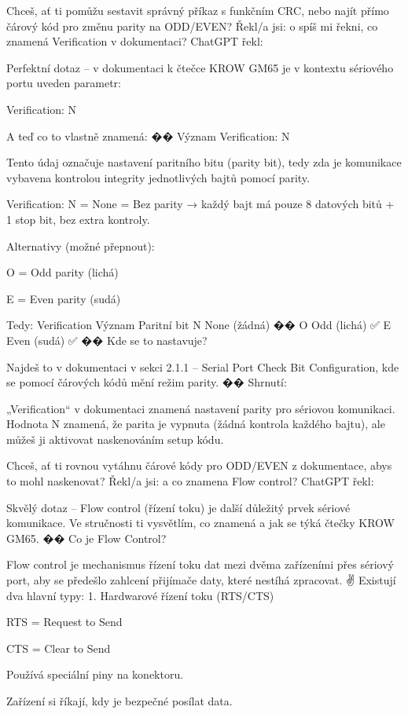 Chceš, ať ti pomůžu sestavit správný příkaz s funkčním CRC, nebo najít přímo čárový kód pro změnu parity na ODD/EVEN?
Řekl/a jsi:
o spíš mi řekni, co znamená Verification v dokumentaci?
ChatGPT řekl:

Perfektní dotaz – v dokumentaci k čtečce KROW GM65 je v kontextu sériového portu uveden parametr:

    Verification: N

A teď co to vlastně znamená:
�� Význam Verification: N

Tento údaj označuje nastavení paritního bitu (parity bit), tedy zda je komunikace vybavena kontrolou integrity jednotlivých bajtů pomocí parity.

    Verification: N = None = Bez parity → každý bajt má pouze 8 datových bitů + 1 stop bit, bez extra kontroly.

    Alternativy (možné přepnout):

        O = Odd parity (lichá)

        E = Even parity (sudá)

Tedy:
Verification	Význam	Paritní bit
N	None (žádná)	��
O	Odd (lichá)	✅
E	Even (sudá)	✅
�� Kde se to nastavuje?

Najdeš to v dokumentaci v sekci 2.1.1 – Serial Port Check Bit Configuration, kde se pomocí čárových kódů mění režim parity.
�� Shrnutí:

„Verification“ v dokumentaci znamená nastavení parity pro sériovou komunikaci. Hodnota N znamená, že parita je vypnuta (žádná kontrola každého bajtu), ale můžeš ji aktivovat naskenováním setup kódu.

Chceš, ať ti rovnou vytáhnu čárové kódy pro ODD/EVEN z dokumentace, abys to mohl naskenovat?
Řekl/a jsi:
a co znamena Flow control?
ChatGPT řekl:

Skvělý dotaz – Flow control (řízení toku) je další důležitý prvek sériové komunikace. Ve stručnosti ti vysvětlím, co znamená a jak se týká čtečky KROW GM65.
�� Co je Flow Control?

Flow control je mechanismus řízení toku dat mezi dvěma zařízeními přes sériový port, aby se předešlo zahlcení přijímače daty, které nestíhá zpracovat.
✌️ Existují dva hlavní typy:
1. Hardwarové řízení toku (RTS/CTS)

    RTS = Request to Send

    CTS = Clear to Send

    Používá speciální piny na konektoru.

    Zařízení si říkají, kdy je bezpečné posílat data.

